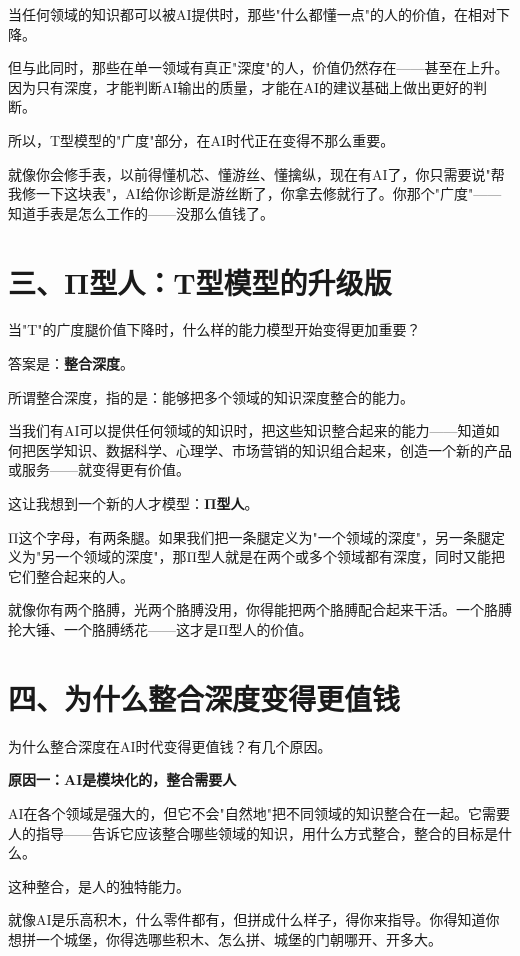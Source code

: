 当任何领域的知识都可以被AI提供时，那些"什么都懂一点"的人的价值，在相对下降。

但与此同时，那些在单一领域有真正"深度"的人，价值仍然存在——甚至在上升。因为只有深度，才能判断AI输出的质量，才能在AI的建议基础上做出更好的判断。

所以，T型模型的"广度"部分，在AI时代正在变得不那么重要。

就像你会修手表，以前得懂机芯、懂游丝、懂擒纵，现在有AI了，你只需要说"帮我修一下这块表"，AI给你诊断是游丝断了，你拿去修就行了。你那个"广度"——知道手表是怎么工作的——没那么值钱了。

\section{三、Π型人：T型模型的升级版}


当"T"的广度腿价值下降时，什么样的能力模型开始变得更加重要？

答案是：\textbf{整合深度}。

所谓整合深度，指的是：能够把多个领域的知识深度整合的能力。

当我们有AI可以提供任何领域的知识时，把这些知识整合起来的能力——知道如何把医学知识、数据科学、心理学、市场营销的知识组合起来，创造一个新的产品或服务——就变得更有价值。

这让我想到一个新的人才模型：\textbf{Π型人}。

Π这个字母，有两条腿。如果我们把一条腿定义为"一个领域的深度"，另一条腿定义为"另一个领域的深度"，那Π型人就是在两个或多个领域都有深度，同时又能把它们整合起来的人。

就像你有两个胳膊，光两个胳膊没用，你得能把两个胳膊配合起来干活。一个胳膊抡大锤、一个胳膊绣花——这才是Π型人的价值。

\section{四、为什么整合深度变得更值钱}


为什么整合深度在AI时代变得更值钱？有几个原因。

\textbf{原因一：AI是模块化的，整合需要人}

AI在各个领域是强大的，但它不会"自然地"把不同领域的知识整合在一起。它需要人的指导——告诉它应该整合哪些领域的知识，用什么方式整合，整合的目标是什么。

这种整合，是人的独特能力。

就像AI是乐高积木，什么零件都有，但拼成什么样子，得你来指导。你得知道你想拼一个城堡，你得选哪些积木、怎么拼、城堡的门朝哪开、开多大。

